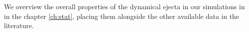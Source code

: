 We overview the overall properties of the dynamical ejecta in our simulations 
in in the chapter \ref{ch:stat}, placing them alongside the other available data 
in the literature.

%
%
